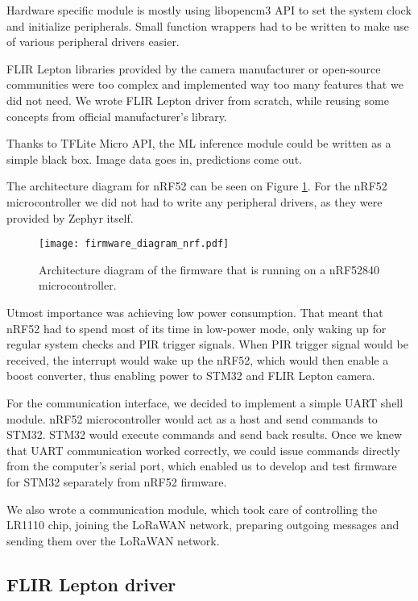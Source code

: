 Hardware specific module is mostly using libopencm3 API to set the system clock and initialize peripherals.
Small function wrappers had to be written to make use of various peripheral drivers easier.

FLIR Lepton libraries provided by the camera manufacturer or open-source communities were too complex and implemented way too many features that we did not need.
We wrote FLIR Lepton driver from scratch, while reusing some concepts from official manufacturer's library.

Thanks to TFLite Micro API, the ML inference module could be written as a simple black box.
Image data goes in, predictions come out.

The architecture diagram for nRF52 can be seen on Figure \ref{firmware_diagram_wisent}.
For the nRF52 microcontroller we did not had to write any peripheral drivers, as they were provided by Zephyr itself.

\begin{figure}[ht]
        \centering
        \texttt{[image: firmware\_diagram\_nrf.pdf]} 
        \caption{ Architecture diagram of the firmware that is running on a nRF52840 microcontroller.} 
        \label{firmware_diagram_wisent}
\end{figure}

Utmost importance was achieving low power consumption.
That meant that nRF52 had to spend most of its time in low-power mode, only waking up for regular system checks and PIR trigger signals.
When PIR trigger signal would be received, the interrupt would wake up the nRF52, which would then enable a boost converter, thus enabling power to STM32 and FLIR Lepton camera.

For the communication interface, we decided to implement a simple UART shell module.
nRF52 microcontroller would act as a host and send commands to STM32.
STM32 would execute commands and send back results.
Once we knew that UART communication worked correctly, we could issue commands directly from the computer's serial port, which enabled us to develop and test firmware for STM32 separately from nRF52 firmware.

We also wrote a communication module, which took care of controlling the LR1110 chip, joining the LoRaWAN network, preparing outgoing messages and sending them over the LoRaWAN network.


\subsection{ FLIR Lepton driver}

